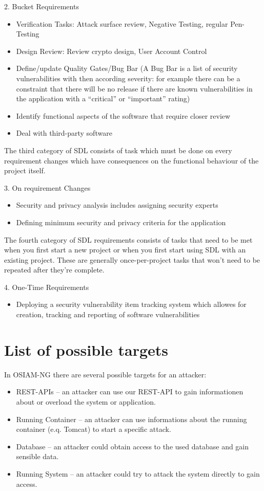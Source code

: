 2. Bucket Requirements
\begin{itemize}
	\item Verification Tasks: Attack surface review, Negative Testing, regular Pen-Testing
	\item Design Review: Review crypto design, User Account Control
	\item Define/update Quality Gates/Bug Bar (A Bug Bar is a list of security vulnerabilities with then according severity: for example there can be a constraint that there will be no release if there are known vulnerabilities in the application with a ``critical'' or ``important'' rating)
	\item Identify functional aspects of the software that require closer review
	\item Deal with third-party software
\end{itemize}

The third category of SDL consists of task which must be done on every requirement changes which have consequences on the functional behaviour of the project itself. 

3. On requirement Changes

\begin{itemize}
	\item Security and privacy analysis includes assigning security experts
	\item Defining minimum security and privacy criteria for the application
\end{itemize}

The fourth category of SDL requirements consists of tasks that need to be met when you first start a new project or when you first start using SDL with an existing project. These are generally once-per-project tasks that won’t need to be repeated after they’re complete.

4. One-Time Requirements
\begin{itemize}
	\item Deploying a security vulnerability item tracking system which allowes for creation, tracking and reporting of software vulnerabilities
\end{itemize}


\section{List of possible targets}
In OSIAM-NG there are several possible targets for an attacker:
\begin{itemize}
\item REST-APIs -- an attacker can use our REST-API to gain informationen about or overload the system or application.
\item Running Container -- an attacker can use informations about the running container (e.q. Tomcat) to start a specific attack.
\item Database -- an attacker could obtain access to the used database and gain sensible data.
\item Running System -- an attacker could try to attack the system directly to gain access.
\end{itemize}

